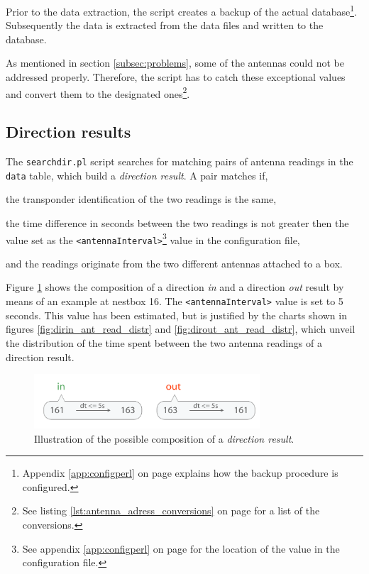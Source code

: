 Prior to the data extraction, the  script creates a backup of the actual database\footnote{Appendix \ref{app:configperl} on page \pageref{app:configperl} explains how the backup procedure is configured.}. Subsequently the data is extracted from the data files and written to the database. 

As mentioned in section \ref{subsec:problems}, some of the antennas could not be addressed properly. Therefore, the script has to catch these exceptional values and convert them to the designated ones\footnote{See listing \ref{lst:antenna_adress_conversions} on page \pageref{lst:antenna_adress_conversions} for a list of the conversions.}.  

\subsection{Direction results}
\label{subsec:dirres}

The \lstinline|searchdir.pl| script searches for matching pairs of antenna readings in the \lstinline|data| table, which build a \textit{direction result}. A pair matches if,

\begin{mylist}
\item the transponder identification of the two readings is the same,
\item the time difference in seconds between the two readings is not greater then the value set as the \lstinline|<antennaInterval>|\footnote{See appendix \ref{app:configperl} on page \pageref{app:configperl} for the location of the value in the configuration file.} value in the configuration file, 
\item and the readings originate from the two different antennas attached to a box.  
\end{mylist}

Figure \ref{fig:direction_result} shows the composition of a direction \textit{in} and a direction \textit{out} result by means of an example at nestbox 16. The \lstinline|<antennaInterval>| value is set to 5 seconds. This value has been estimated, but is justified by the charts shown in figures \ref{fig:dirin_ant_read_distr} and \ref{fig:dirout_ant_read_distr}, which unveil the distribution of the time spent between the two antenna readings of a direction result.

\begin{figure}[htpb]
\begin{center}
  \includegraphics[width=0.75\textwidth]{assets/pdf/direction_result_schema.pdf}
  \caption[Illustration of a direction result]{Illustration of the possible composition of a \textit{direction result}.}
  \label{fig:direction_result}
\end{center}
\end{figure}

